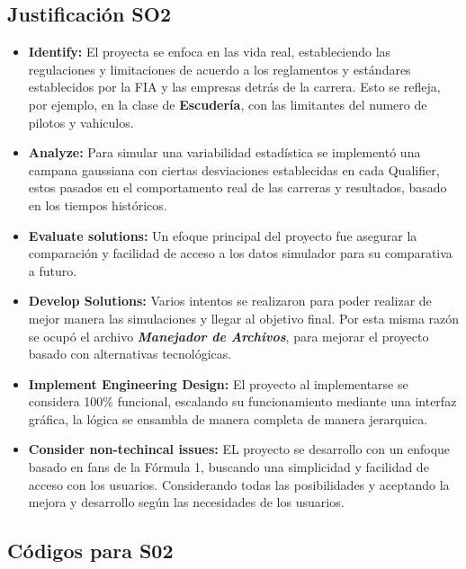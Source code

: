 \documentclass[12pt,a4paper]{article}
\begin{document}
\subsection{Justificación SO2}
\begin{itemize}
    \item \textbf{Identify:} El proyecta se enfoca en las vida real, estableciendo las regulaciones y limitaciones de acuerdo a los reglamentos y estándares establecidos por la FIA y las empresas detrás de la carrera. Esto se refleja, por ejemplo, en la clase de \textbf{Escudería}, con las limitantes del numero de pilotos y vahiculos.
    \item \textbf{Analyze:} Para simular una variabilidad estadística se implementó una campana gaussiana con ciertas desviaciones establecidas en cada Qualifier, estos pasados en el comportamento real de las carreras y resultados, basado en los tiempos históricos. 
    \item \textbf{Evaluate solutions:} Un efoque principal del proyecto fue asegurar la comparación y facilidad de acceso a los datos simulador para su comparativa a futuro. 
    \item \textbf{Develop Solutions:} Varios intentos se realizaron para poder realizar de mejor manera las simulaciones y llegar al objetivo final. Por esta misma razón se ocupó el archivo \textbf{\textit{Manejador de Archivos}}, para mejorar el proyecto basado con alternativas tecnológicas.
    \item \textbf{Implement Engineering Design:} El proyecto al implementarse se considera 100\% funcional, escalando su funcionamiento mediante una interfaz gráfica, la lógica se ensambla de manera completa de manera jerarquica.
    \item \textbf{Consider non-techincal issues:} EL proyecto se desarrollo con un enfoque basado en fans de la Fórmula 1, buscando una simplicidad y facilidad de acceso con los usuarios. Considerando todas las posibilidades y aceptando la mejora y desarrollo según las necesidades de los usuarios. 
\end{itemize}

\subsection{Códigos para S02}
\end{document}
